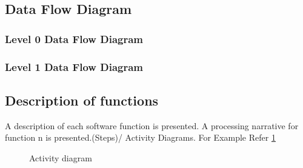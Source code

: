 \documentclass[oneside,a4paper,12pt]{report}
\begin{document}
\subsection{Data Flow Diagram}
\subsubsection{Level 0 Data Flow Diagram}
\subsubsection{Level 1 Data Flow Diagram}

\subsection{Description of functions}
A description of each software function is presented. A processing narrative for function n is presented.(Steps)/ Activity Diagrams. For Example Refer \ref{fig:act-dig}



\begin{center}
	\begin{figure}[!htbp]
		\centering
	  \caption{Activity diagram}
	  \label{fig:act-dig}
	\end{figure}
\end{center}
\end{document}
